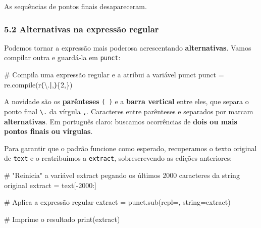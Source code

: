 \documentclass[
  brazilian,
  11pt,
]{article}
\newenvironment{Shaded}{\begin{snugshade}}{\end{snugshade}}
\newcommand{\BuiltInTok}[1]{\textcolor[rgb]{0.50,0.55,0.55}{#1}}
\newcommand{\CharTok}[1]{\textcolor[rgb]{0.24,0.68,0.91}{#1}}
\newcommand{\CommentTok}[1]{\textcolor[rgb]{0.48,0.49,0.49}{#1}}
\newcommand{\ControlFlowTok}[1]{\textcolor[rgb]{0.99,0.74,0.29}{\textbf{#1}}}
\newcommand{\DecValTok}[1]{\textcolor[rgb]{0.96,0.45,0.00}{#1}}
\newcommand{\KeywordTok}[1]{\textcolor[rgb]{0.81,0.81,0.76}{\textbf{#1}}}
\newcommand{\NormalTok}[1]{\textcolor[rgb]{0.81,0.81,0.76}{#1}}
\newcommand{\OperatorTok}[1]{\textcolor[rgb]{0.81,0.81,0.76}{#1}}
\newcommand{\StringTok}[1]{\textcolor[rgb]{0.96,0.31,0.31}{#1}}
\newcommand{\VerbatimStringTok}[1]{\textcolor[rgb]{0.85,0.27,0.33}{#1}}
\let\oldtexttt\texttt
\renewcommand{\texttt}[1]{{\color{inlink}\oldtexttt{#1}}}
\begin{document}
As sequências de pontos finais desapareceram.

\subsubsection{5.2 Alternativas na expressão
regular}\label{alternativas-na-expressuxe3o-regular}

Podemos tornar a expressão mais poderosa acrescentando
\textbf{alternativas}. Vamos compilar outra e guardá‑la em
\texttt{punct}:

\begin{Shaded}
\begin{Highlighting}[]
\CommentTok{\# Compila uma expressão regular e a atribui a variável \textquotesingle{}punct\textquotesingle{}}
\NormalTok{punct }\OperatorTok{=}\NormalTok{ re.}\BuiltInTok{compile}\NormalTok{(}\VerbatimStringTok{r\textquotesingle{}}\KeywordTok{(}\CharTok{\textbackslash{}.}\ControlFlowTok{|}\VerbatimStringTok{,}\KeywordTok{)}\OperatorTok{\{2,\}}\VerbatimStringTok{\textquotesingle{}}\NormalTok{)}
\end{Highlighting}
\end{Shaded}

A novidade são os \textbf{parênteses} \texttt{(\ )} e a \textbf{barra
vertical} \texttt{\textbar{}} entre eles, que separa o ponto final
\texttt{\textbackslash{}.} da vírgula \texttt{,}. Caracteres entre
parênteses e separados por \texttt{\textbar{}} marcam
\textbf{alternativas}. Em português claro: buscamos ocorrências de
\textbf{dois ou mais pontos finais ou vírgulas}.

Para garantir que o padrão funcione como esperado, recuperamos o texto
original de \texttt{text} e o reatribuímos a \texttt{extract},
sobrescrevendo as edições anteriores:

\begin{Shaded}
\begin{Highlighting}[]
\CommentTok{\# "Reinicia" a variável extract pegando os últimos 2000 caracteres da string original}
\NormalTok{extract }\OperatorTok{=}\NormalTok{ text[}\OperatorTok{{-}}\DecValTok{2000}\NormalTok{:]}

\CommentTok{\# Aplica a expressão regular}
\NormalTok{extract }\OperatorTok{=}\NormalTok{ punct.sub(repl}\OperatorTok{=}\StringTok{\textquotesingle{}\textquotesingle{}}\NormalTok{, string}\OperatorTok{=}\NormalTok{extract)}

\CommentTok{\# Imprime o resultado}
\BuiltInTok{print}\NormalTok{(extract)}
\end{Highlighting}
\end{Shaded}
\end{document}
